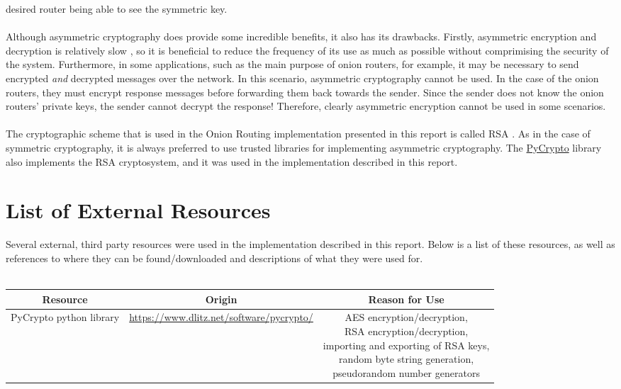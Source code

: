 \documentclass[10pt]{report}
\begin{document}
\begin{appendix}
    desired router being able to see the symmetric key.\\\\
    Although asymmetric cryptography does provide some incredible benefits, it also has its
    drawbacks. Firstly, asymmetric encryption and decryption is relatively slow
    \cite{SymmetricVsAsymmetric}, so it is beneficial to reduce the frequency of its use as much as
    possible without comprimising the security of the system. Furthermore, in some applications,
    such as the main purpose of onion routers, for example, it may be necessary to send encrypted
    \textit{and} decrypted messages over the network. In this scenario, asymmetric cryptography
    cannot be used. In the case of the onion routers, they must encrypt response messages before
    forwarding them back towards the sender. Since the sender does not know the onion routers'
    private keys, the sender cannot decrypt the response! Therefore, clearly asymmetric encryption
    cannot be used in some scenarios.\\\\
    The cryptographic scheme that is used in the Onion Routing implementation presented in this
    report is called RSA \cite{RSA}. As in the case of symmetric cryptography, it is always
    preferred to use trusted libraries for implementing asymmetric cryptography. The
    \href{https://www.dlitz.net/software/pycrypto/}{PyCrypto} library also implements the RSA
    cryptosystem, and it was used in the implementation described in this report.
    \chapter{List of External Resources}
    Several external, third party resources were used in the implementation described in this
    report. Below is a list of these resources, as well as references to where they can be
    found/downloaded and descriptions of what they were used for.\\\\
    \begin{tabular}{|c|c|c|}
        \hline
        \textbf{Resource} & \textbf{Origin} & \textbf{Reason for Use}\\\hline
        PyCrypto python library & \url{https://www.dlitz.net/software/pycrypto/} & \makecell{AES
        encryption/decryption,\\RSA encryption/decryption,\\importing and exporting of RSA keys,\\random
        byte string generation,\\pseudorandom number generators}\\\hline
    \end{tabular}
\end{appendix}



\end{document}
